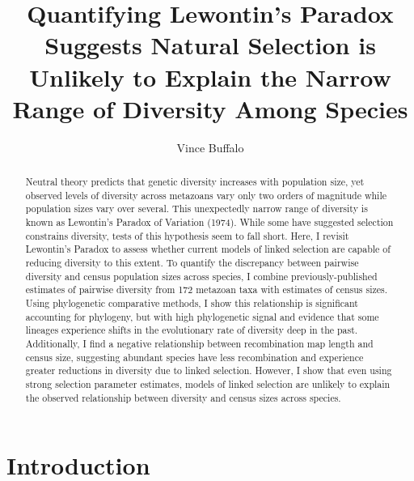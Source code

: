 \documentclass[9pt,lineno]{elife}
\title{Quantifying Lewontin's Paradox Suggests Natural Selection is Unlikely to
Explain the Narrow Range of Diversity Among Species}
\author[1*]{Vince Buffalo}
\affil[1]{Institute of Ecology and Evolution, University of Oregon, United States}
\begin{document}
\maketitle

\begin{abstract}

 Neutral theory predicts that genetic diversity increases with population size,
 yet observed levels of diversity across metazoans vary only two orders of
 magnitude while population sizes vary over several. This unexpectedly narrow
 range of diversity is known as Lewontin's Paradox of Variation (1974). While
 some have suggested selection constrains diversity, tests of this hypothesis
 seem to fall short. Here, I revisit Lewontin's Paradox to assess whether
 current models of linked selection are capable of reducing diversity to this
 extent. To quantify the discrepancy between pairwise diversity and census
 population sizes across species, I combine previously-published estimates of
 pairwise diversity from 172 metazoan taxa with estimates of census sizes.
 Using phylogenetic comparative methods, I show this relationship is
 significant accounting for phylogeny, but with high phylogenetic signal and
 evidence that some lineages experience shifts in the evolutionary rate of
 diversity deep in the past. Additionally, I find a negative relationship
 between recombination map length and census size, suggesting abundant species
 have less recombination and experience greater reductions in diversity due to
 linked selection. However, I show that even using strong selection parameter
 estimates, models of linked selection are unlikely to explain the observed
 relationship between diversity and census sizes across species.
\end{abstract}


\section{Introduction}
\end{document}
